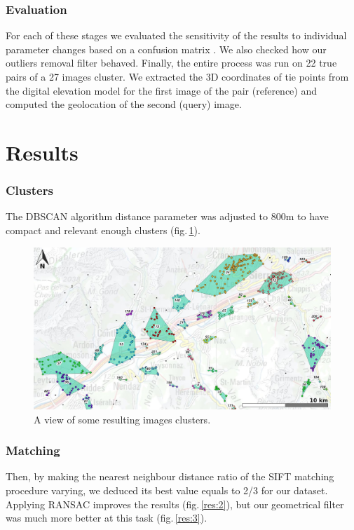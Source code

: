 \documentclass[fleqn,10pt]{wlpeerj} %
\begin{document}
\subsubsection*{Evaluation}
For each of these stages we evaluated the sensitivity of the results to individual
parameter changes based on a confusion matrix \citep{stehman1997}.
We also checked how our outliers removal filter behaved.
Finally, the entire process was run on 22 true pairs of a 27 images cluster. 
We extracted the 3D coordinates of tie points from the digital elevation model
for the first image of the pair (reference) and computed the geolocation of 
the second (query) image.



\section*{Results}
\subsubsection*{Clusters}
The DBSCAN algorithm distance parameter was adjusted to 800m to have compact and
relevant enough clusters (fig.\,\ref{clusters}).

\begin{figure}[H]
\centering
\includegraphics[width=0.8\linewidth]{clusters2.jpg}
\caption{A view of some resulting images clusters.}
\label{clusters}
\end{figure}


\subsubsection*{Matching}
Then, by making the nearest neighbour distance ratio of the SIFT matching 
procedure varying, we deduced its best value equals to 2/3 for our dataset.
Applying RANSAC improves the results (fig.\,\ref{res:2}), but our geometrical 
filter was much more better at this task (fig.\,\ref{res:3}).
\end{document}
